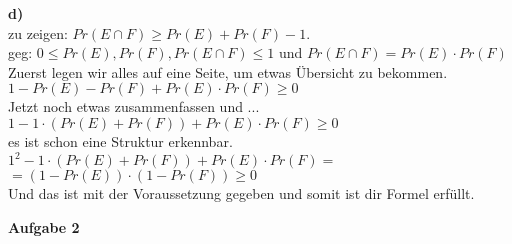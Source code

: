 \documentclass[a4paper]{scrartcl}
\begin{document}
\begin{flushleft}
		\textbf{d)}\\
		zu zeigen: $Pr(E\cap F) \geq Pr(E)+Pr(F)-1$.\\
		geg: $0\leq Pr(E),Pr(F),Pr(E\cap F)\leq 1$ und $Pr(E\cap F)=Pr(E)\cdot Pr(F)$\\[1em]
		Zuerst legen wir alles auf eine Seite, um etwas Übersicht zu bekommen.\\
		$1 - Pr(E) - Pr(F) + Pr(E)\cdot Pr(F) \geq 0$\\
		Jetzt noch etwas zusammenfassen und ...\\
		$1 - 1\cdot(Pr(E) + Pr(F)) + Pr(E)\cdot Pr(F) \geq 0$\\
		es ist schon eine Struktur erkennbar.\\
		$1^2 - 1\cdot(Pr(E) + Pr(F)) + Pr(E)\cdot Pr(F) =$\\
		$= (1-Pr(E))\cdot(1-Pr(F))\geq 0$\\[1em]
		Und das ist mit der Voraussetzung gegeben und somit ist dir Formel erfüllt.\\[1em]
	\end{flushleft}
	\begin{flushleft}
		\textbf{Aufgabe 2}\\
	\end{flushleft}
\end{document}
